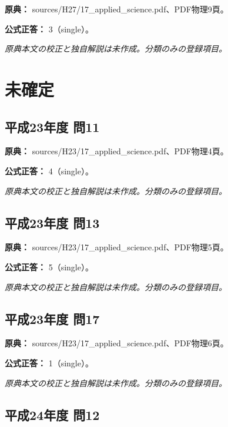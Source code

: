 \noindent\textbf{原典：} sources/H27/17\_applied\_science.pdf、PDF物理9頁。

\textbf{公式正答：} 3（single）。

\par\textit{原典本文の校正と独自解説は未作成。分類のみの登録項目。}

\section{未確定}

\subsection{平成23年度 問11}
\label{q:h23-reg-applied-11}

\noindent\textbf{原典：} sources/H23/17\_applied\_science.pdf、PDF物理4頁。

\textbf{公式正答：} 4（single）。

\par\textit{原典本文の校正と独自解説は未作成。分類のみの登録項目。}

\subsection{平成23年度 問13}
\label{q:h23-reg-applied-13}

\noindent\textbf{原典：} sources/H23/17\_applied\_science.pdf、PDF物理5頁。

\textbf{公式正答：} 5（single）。

\par\textit{原典本文の校正と独自解説は未作成。分類のみの登録項目。}

\subsection{平成23年度 問17}
\label{q:h23-reg-applied-17}

\noindent\textbf{原典：} sources/H23/17\_applied\_science.pdf、PDF物理6頁。

\textbf{公式正答：} 1（single）。

\par\textit{原典本文の校正と独自解説は未作成。分類のみの登録項目。}

\subsection{平成24年度 問12}
\label{q:h24-reg-applied-12}

